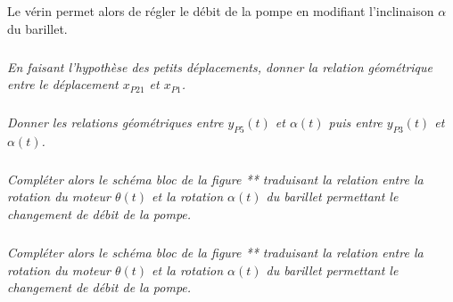 \documentclass[10pt,fleqn]{article} %
\begin{document}
\begin{multicols}{2}
Le vérin permet alors de régler le débit de la pompe en modifiant l'inclinaison $\alpha$ du barillet.


\subparagraph{}
\textit{En faisant l'hypothèse des petits déplacements, donner la relation géométrique entre le déplacement $x_{P21}$ et $x_{P1}$.}
\begin{corrige}

\end{corrige}

\subparagraph{}
\textit{Donner les relations géométriques entre $y_{P5}(t)$ et $\alpha(t)$ puis entre $y_{P3}(t)$ et $\alpha(t)$.}
\begin{corrige}

\end{corrige}

\subparagraph{}
\textit{Compléter alors le schéma bloc de la figure ** traduisant la relation entre la rotation du moteur $\theta(t)$ et la rotation $\alpha(t)$ du barillet permettant le changement de débit de la pompe.}
\begin{corrige}

\end{corrige}

\subparagraph{}
\textit{Compléter alors le schéma bloc de la figure ** traduisant la relation entre la rotation du moteur $\theta(t)$ et la rotation $\alpha(t)$ du barillet permettant le changement de débit de la pompe.}
\begin{corrige}

\end{corrige}

\end{multicols}
\end{document}
